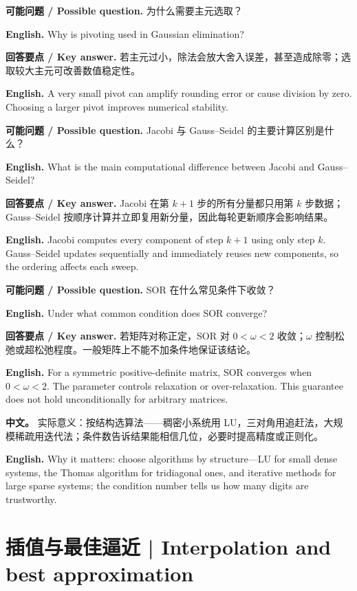 \documentclass[UTF8,11pt,a4paper]{ctexart}
\newcommand{\EN}[1]{\par\noindent\textbf{English.} #1\par}
\newcommand{\ASK}[4]{\par\noindent\textbf{可能问题 / Possible question.} #1\par\EN{#2}\noindent\textbf{回答要点 / Key answer.} #3\par\EN{#4}\medskip}
\newcommand{\APS}[2]{\par\noindent\textbf{中文。} #1\par\noindent\textbf{English.} #2\par\smallskip}
\begin{document}
\ASK{为什么需要主元选取？}{Why is pivoting used in Gaussian elimination?}{若主元过小，除法会放大舍入误差，甚至造成除零；选取较大主元可改善数值稳定性。}{A very small pivot can amplify rounding error or cause division by zero. Choosing a larger pivot improves numerical stability.}

\ASK{Jacobi 与 Gauss--Seidel 的主要计算区别是什么？}{What is the main computational difference between Jacobi and Gauss--Seidel?}{Jacobi 在第 $k+1$ 步的所有分量都只用第 $k$ 步数据；Gauss--Seidel 按顺序计算并立即复用新分量，因此每轮更新顺序会影响结果。}{Jacobi computes every component of step $k+1$ using only step $k$. Gauss--Seidel updates sequentially and immediately reuses new components, so the ordering affects each sweep.}

\ASK{SOR 在什么常见条件下收敛？}{Under what common condition does SOR converge?}{若矩阵对称正定，SOR 对 $0<\omega<2$ 收敛；$\omega$ 控制松弛或超松弛程度。一般矩阵上不能不加条件地保证该结论。}{For a symmetric positive-definite matrix, SOR converges when $0<\omega<2$. The parameter controls relaxation or over-relaxation. This guarantee does not hold unconditionally for arbitrary matrices.}
\APS{实际意义：按结构选算法——稠密小系统用 LU，三对角用追赶法，大规模稀疏用迭代法；条件数告诉结果能相信几位，必要时提高精度或正则化。}{Why it matters: choose algorithms by structure---LU for small dense systems, the Thomas algorithm for tridiagonal ones, and iterative methods for large sparse systems; the condition number tells us how many digits are trustworthy.}

\section{插值与最佳逼近 | Interpolation and best approximation}
\end{document}
